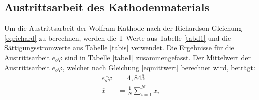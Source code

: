 \subsection{Austrittsarbeit des Kathodenmaterials}
Um die Austrittsarbeit der Wolfram-Kathode nach der Richardson-Gleichung \ref{eqrichard} zu berechnen,
werden die T Werte aus Tabelle \ref{tabd1} und die Sättigungsstromwerte aus Tabelle \ref{tabis}
verwendet. Die Ergebnisse für die Austrittsarbeit $e_o\varphi$ sind in Tabelle \ref{tabe1} zusammengefasst.
Der Mittelwert der Austrittsarbeit $\overline{e_o\varphi}$, welcher nach Gleichung \ref{eqmittwert} berechnet
wird, beträgt:
\begin{align}
\overline{e_o\varphi}&=4,84\overline{3} \label{eqphi} \\
\overline{x}&=\frac{1}{N}\sum\limits_{i=1}^N x_i \label{eqmittwert}
\end{align}

\FloatBarrier

